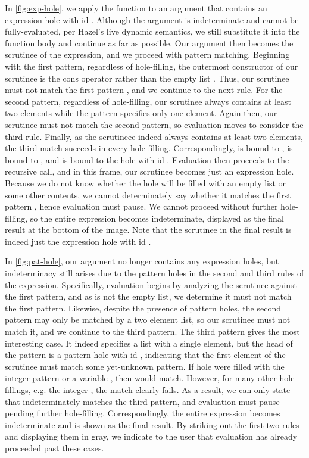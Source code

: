 In \autoref{fig:exp-hole}, we apply the function  to an argument that contains an expression hole with id . Although the argument is indeterminate and cannot be fully-evaluated, per Hazel's live dynamic semantics, we still substitute it into the function body and continue as far as possible. Our argument then becomes the scrutinee of the  expression, and we proceed with pattern matching. Beginning with the first pattern, regardless of hole-filling, the outermost constructor of our scrutinee is the cons operator \li{::} rather than the empty list \li{[]}. Thus, our scrutinee must not match the first pattern \li{[]}, and we continue to the next rule. For the second pattern, regardless of hole-filling, our scrutinee always contains at least two elements while the pattern specifies only one element. Again then, our scrutinee must not match the second pattern, so evaluation moves to consider the third rule. Finally, as the scrutineee indeed always contains at least two elements, the third match succeeds in every hole-filling. Correspondingly,  is bound to ,  is bound to , and  is bound to the hole with id . Evaluation then proceeds to the recursive call, and in this frame, our scrutinee becomes just an expression hole. Because we do not know whether the hole will be filled with an empty list or some other contents, we cannot determinately say whether it matches the first  pattern \li{[]}, hence evaluation must pause. We cannot proceed without further hole-filling, so the entire  expression becomes indeterminate, displayed as the final result at the bottom of the image. Note that the scrutinee in the final result is indeed just the expression hole with id .

In \autoref{fig:pat-hole}, our argument no longer contains any expression holes, but indeterminacy still arises due to the pattern holes in the second and third rules of the  expression. Specifically, evaluation begins by analyzing the scrutinee against the first pattern, and as  is not the empty list, we determine it must not match the first pattern. Likewise, despite the presence of pattern holes, the second pattern may only be matched by a two element list, so our scrutinee must not match it, and we continue to the third pattern. The third pattern gives the most interesting case. It indeed specifies a list with a single element, but the head of the pattern is a  pattern hole with id , indicating that the first element of the scrutinee must match some yet-unknown pattern. If hole  were filled with the integer pattern  or a variable , then  would match. However, for many other hole-fillings, e.g. the integer , the match clearly fails. As a result, we can only state that  indeterminately matches the third pattern, and evaluation must pause pending further hole-filling. Correspondingly, the entire  expression becomes indeterminate and is shown as the final result. By striking out the first two rules and displaying them in gray, we indicate to the user that evaluation has already proceeded past these cases.

